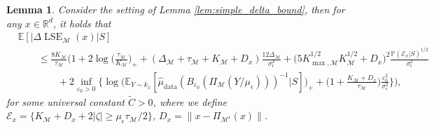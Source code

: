 \documentclass[10pt]{article}
\theoremstyle{plain}
\newtheorem{lemma}[theorem]{Lemma}
\theoremstyle{definition}
\theoremstyle{remark}
\newcommand{\M}{{\mathcal{M}}}
\newcommand{\R}{\mathbb{R}}
\newcommand{\lse}{\operatorname{LSE}}
\newcommand{\E}{\mathbb{E}}
\newcommand{\prob}{\mathbb{P}}
\newcommand{\Pieps}{\Pi_{\M^\epsilon}}
\newcommand{\gap}{\Delta_\M}
\begin{document}
\begin{lemma}\label{lem:tighter_delta_bound}
Consider the setting of Lemma \ref{lem:simple_delta_bound}, then for any \(x \in \R^d\), it holds that
\begin{align*}
    &\E[|\Delta \lse_\M(x)|S]\\
    & \qquad \leq \frac{8 K_\M}{\tau_\M} \bigg ( 1 + 2\log \big ( \tfrac{\tau_\M}{K_\M} \big )_+ + (\gap + \tau_\M + K_\M + D_x ) \frac{12\gap}{\sigma_\epsilon^2} + \Big ( 5 K_{\max, \M}^{1/2} K_\M^{1/2} + D_x \Big )^2 \frac{\prob(\mathcal{E}_x|S)^{1/2}}{\sigma_\epsilon^2}\\
    & \qquad \qquad + 2\inf_{\varepsilon_0 > 0} \bigg \{ \log \Big ( \E_{Y \sim k_x} [ \hat{\mu}_{\operatorname{data}}(B_{\varepsilon_0}(\Pi_\M(Y/\mu_\epsilon)))^{-1} | S ] \Big )_+ + \Big ( 1 + \tfrac{K_\M + D_x}{\tau_\M} \Big ) \frac{\varepsilon_0^2}{\sigma_\epsilon^2} \bigg \} \bigg ),
\end{align*}
for some universal constant \(\tilde{C} > 0\), where we define \(\mathcal{E}_x = \{ K_\M + D_x + 2 |\zeta| \geq \mu_\epsilon \tau_\M / 2 \}\), \(D_x = \|x - \Pieps(x)\|\).
\end{lemma}
\end{document}
